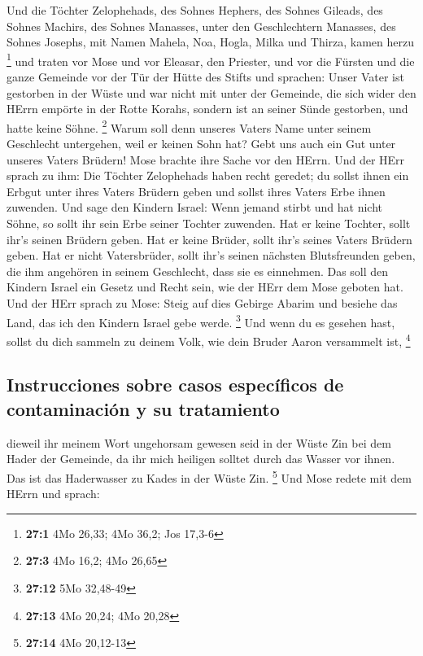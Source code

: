  Und die Töchter Zelophehads, des Sohnes Hephers, des
Sohnes Gileads, des Sohnes Machirs, des Sohnes Manasses, unter den
Geschlechtern Manasses, des Sohnes Josephs, mit Namen Mahela, Noa,
Hogla, Milka und Thirza, kamen herzu \footnote{\textbf{27:1} 4Mo 26,33;
  4Mo 36,2; Jos 17,3-6}  und traten vor Mose und vor
Eleasar, den Priester, und vor die Fürsten und die ganze Gemeinde vor
der Tür der Hütte des Stifts und sprachen:  Unser Vater
ist gestorben in der Wüste und war nicht mit unter der Gemeinde, die
sich wider den HErrn empörte in der Rotte Korahs, sondern ist an seiner
Sünde gestorben, und hatte keine Söhne. \footnote{\textbf{27:3} 4Mo
  16,2; 4Mo 26,65}  Warum soll denn unseres Vaters Name
unter seinem Geschlecht untergehen, weil er keinen Sohn hat? Gebt uns
auch ein Gut unter unseres Vaters Brüdern!  Mose brachte
ihre Sache vor den HErrn.  Und der HErr sprach zu ihm:
 Die Töchter Zelophehads haben recht geredet; du sollst
ihnen ein Erbgut unter ihres Vaters Brüdern geben und sollst ihres
Vaters Erbe ihnen zuwenden.  Und sage den Kindern Israel:
Wenn jemand stirbt und hat nicht Söhne, so sollt ihr sein Erbe seiner
Tochter zuwenden.  Hat er keine Tochter, sollt ihr's
seinen Brüdern geben.  Hat er keine Brüder, sollt ihr's
seines Vaters Brüdern geben.  Hat er nicht Vatersbrüder,
sollt ihr's seinen nächsten Blutsfreunden geben, die ihm angehören in
seinem Geschlecht, dass sie es einnehmen. Das soll den Kindern Israel
ein Gesetz und Recht sein, wie der HErr dem Mose geboten hat.
 Und der HErr sprach zu Mose: Steig auf dies Gebirge
Abarim und besiehe das Land, das ich den Kindern Israel gebe werde.
\footnote{\textbf{27:12} 5Mo 32,48-49}  Und wenn du es
gesehen hast, sollst du dich sammeln zu deinem Volk, wie dein Bruder
Aaron versammelt ist, \footnote{\textbf{27:13} 4Mo 20,24; 4Mo 20,28}

\hypertarget{instrucciones-sobre-casos-especuxedficos-de-contaminaciuxf3n-y-su-tratamiento}{%
\subsection{Instrucciones sobre casos específicos de contaminación y su
tratamiento}\label{instrucciones-sobre-casos-especuxedficos-de-contaminaciuxf3n-y-su-tratamiento}}

 dieweil ihr meinem Wort ungehorsam gewesen seid in der
Wüste Zin bei dem Hader der Gemeinde, da ihr mich heiligen solltet durch
das Wasser vor ihnen. Das ist das Haderwasser zu Kades in der Wüste Zin.
\footnote{\textbf{27:14} 4Mo 20,12-13}  Und Mose redete
mit dem HErrn und sprach:

